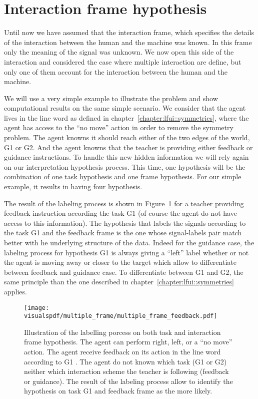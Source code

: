 
\section{Interaction frame hypothesis}


Until now we have assumed that the interaction frame, which specifies the details of the interaction between the human and the machine was known. In this frame only the meaning of the signal was unknown. We now open this side of the interaction and considered the case where multiple interaction are define, but only one of them account for the interaction between the human and the machine.

We will use a very simple example to illustrate the problem and show computational results on the same simple scenario. We consider that the agent lives in the line word as defined in chapter~\ref{chapter:lfui::symmetries}, where the agent has access to the ``no move'' action in order to remove the symmetry problem. The agent knowns it should reach either of the two edges of the world, G1 or G2. And the agent knowns that the teacher is providing either feedback or guidance instructions. To handle this new hidden information we will rely again on our interpretation hypothesis process. This time, one hypothesis will be the combination of one task hypothesis and one frame hypothesis.  For our simple example, it results in having four hypothesis.

The result of the labeling process is shown in Figure~\ref{fig:multipleframeexplainedfeedback} for a teacher providing feedback instruction according the task G1 (of course the agent do not have access to this information). The hypothesis that labels the signals according to the task G1 and the feedback frame is the one whose signal-labels pair match better with he underlying structure of the data. Indeed for the guidance case, the labeling process for hypothesis G1 is always giving a ``left'' label whether or not the agent is moving away or closer to the target which allow to differentiate between feedback and guidance case. To differentiate between G1 and G2, the same principle than the one described in chapter~\ref{chapter:lfui::symmetries} applies.

\begin{figure}[!ht]
\centering
\texttt{[image: \\visualspdf/multiple\_frame/multiple\_frame\_feedback.pdf]}
\caption{Illustration of the labelling porcess on both task and interaction frame hypothesis. The agent can perform right, left, or a ``no move'' action. The agent receive feedback on its action in the line word according to G1 . The agent do not known which task (G1 or G2) neither which interaction scheme the teacher is following (feedback or guidance). The result of the labeling process allow to identify the hypothesis on task G1 and feedback frame as the more likely.}
\label{fig:multipleframeexplainedfeedback}
\end{figure} 

